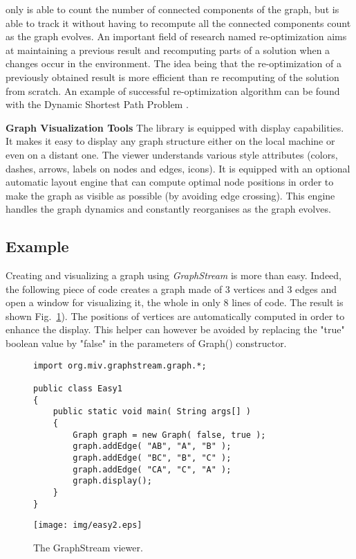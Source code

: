 \documentclass{svmult}
\begin{document}
\begin{description}
                only is able to count the number of connected components of the graph, but is able to track
                it without having to recompute all the connected components count as the graph evolves. An
                important field of research named re-optimization aims at maintaining a previous result and 
                recomputing parts of a solution when a changes occur in the environment. The idea being that
                the re-optimization of a previously obtained result is more efficient than re recomputing of
                the solution from scratch. An example of successful re-optimization algorithm can be found
                with the Dynamic Shortest Path Problem \cite{Demetrescu2001}. 
         \item{\textbf{Graph Visualization Tools}} The library is equipped with display capabilities. It
                makes it easy to display any graph structure either on the local machine or even on a
                distant one. The viewer understands various style attributes (colors, dashes, arrows, labels
                on nodes and edges, icons). It is equipped with an optional automatic layout engine that
                can compute optimal node positions in order to make the graph as visible as possible (by
                avoiding edge crossing). This engine handles the graph dynamics and constantly reorganises
                as the graph evolves.
\end{description}


\subsection{Example}


Creating and visualizing a graph using \emph{GraphStream} is more than easy. 
Indeed, the following piece of code creates a graph made of 3 vertices and 3
edges and open a window for visualizing it, the whole in only 8 lines of code.
The result is shown Fig.~\ref{fig:viewer}). 
The positions of vertices are automatically computed in order to enhance the
display. This helper can however be avoided by replacing the "true" boolean
value by "false" in the parameters of Graph() constructor. 

\begin{figure}[h]

\begin{verbatim}
import org.miv.graphstream.graph.*;
 
public class Easy1
{
    public static void main( String args[] )
    {  
        Graph graph = new Graph( false, true ); 
        graph.addEdge( "AB", "A", "B" ); 
        graph.addEdge( "BC", "B", "C" ); 
        graph.addEdge( "CA", "C", "A" ); 
        graph.display();
    }  
}
\end{verbatim}

        \centering
                \texttt{[image: img/easy2.eps]}
        \caption{The GraphStream viewer.}
        \label{fig:viewer}
\end{figure}
\FloatBarrier
\end{document}
